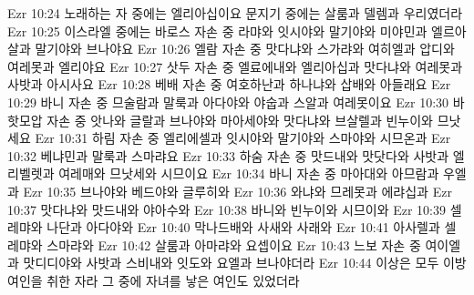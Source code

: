 Ezr 10:24  노래하는 자 중에는 엘리아십이요 문지기 중에는 살룸과 델렘과 우리였더라
Ezr 10:25  이스라엘 중에는 바로스 자손 중 라먀와 잇시야와 말기야와 미야민과 엘르아살과 말기야와 브나야요
Ezr 10:26  엘람 자손 중 맛다냐와 스가랴와 여히엘과 압디와 여레못과 엘리야요
Ezr 10:27  삿두 자손 중 엘료에내와 엘리아십과 맛다냐와 여레못과 사밧과 아시사요
Ezr 10:28  베배 자손 중 여호하난과 하나냐와 삽배와 아들래요
Ezr 10:29  바니 자손 중 므술람과 말룩과 아다야와 야숩과 스알과 여레못이요
Ezr 10:30  바핫모압 자손 중 앗나와 글랄과 브나야와 마아세야와 맛다냐와 브살렐과 빈누이와 므낫세요
Ezr 10:31  하림 자손 중 엘리에셀과 잇시야와 말기야와 스마야와 시므온과
Ezr 10:32  베냐민과 말룩과 스마랴요
Ezr 10:33  하숨 자손 중 맛드내와 맛닷다와 사밧과 엘리벨렛과 여레매와 므낫세와 시므이요
Ezr 10:34  바니 자손 중 마아대와 아므람과 우엘과
Ezr 10:35  브나야와 베드야와 글루히와
Ezr 10:36  와냐와 므레못과 에랴십과
Ezr 10:37  맛다냐와 맛드내와 야아수와
Ezr 10:38  바니와 빈누이와 시므이와
Ezr 10:39  셀레먀와 나단과 아다야와
Ezr 10:40  막나드배와 사새와 사래와
Ezr 10:41  아사렐과 셀레먀와 스마랴와
Ezr 10:42  살룸과 아마랴와 요셉이요
Ezr 10:43  느보 자손 중 여이엘과 맛디디야와 사밧과 스비내와 잇도와 요엘과 브나야더라
Ezr 10:44  이상은 모두 이방 여인을 취한 자라 그 중에 자녀를 낳은 여인도 있었더라


